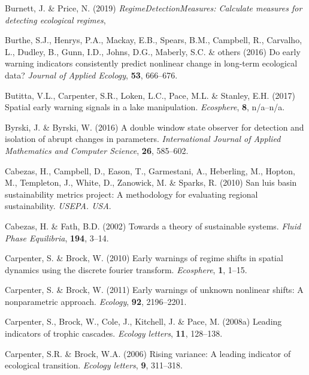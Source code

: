\documentclass[12pt,twoside,openany]{reedthesis}
\begin{document}
\leavevmode\hypertarget{ref-regimeDetectionMeasures}{}%
Burnett, J. \& Price, N. (2019) \emph{RegimeDetectionMeasures: Calculate measures for detecting ecological regimes},

\leavevmode\hypertarget{ref-burthe2016early}{}%
Burthe, S.J., Henrys, P.A., Mackay, E.B., Spears, B.M., Campbell, R., Carvalho, L., Dudley, B., Gunn, I.D., Johns, D.G., Maberly, S.C. \& others (2016) Do early warning indicators consistently predict nonlinear change in long-term ecological data? \emph{Journal of Applied Ecology}, \textbf{53}, 666--676.

\leavevmode\hypertarget{ref-butitta_spatial_2017}{}%
Butitta, V.L., Carpenter, S.R., Loken, L.C., Pace, M.L. \& Stanley, E.H. (2017) Spatial early warning signals in a lake manipulation. \emph{Ecosphere}, \textbf{8}, n/a--n/a.

\leavevmode\hypertarget{ref-byrski2016double}{}%
Byrski, J. \& Byrski, W. (2016) A double window state observer for detection and isolation of abrupt changes in parameters. \emph{International Journal of Applied Mathematics and Computer Science}, \textbf{26}, 585--602.

\leavevmode\hypertarget{ref-cabezas_san_2010}{}%
Cabezas, H., Campbell, D., Eason, T., Garmestani, A., Heberling, M., Hopton, M., Templeton, J., White, D., Zanowick, M. \& Sparks, R. (2010) San luis basin sustainability metrics project: A methodology for evaluating regional sustainability. \emph{USEPA. USA}.

\leavevmode\hypertarget{ref-cabezas_towards_2002}{}%
Cabezas, H. \& Fath, B.D. (2002) Towards a theory of sustainable systems. \emph{Fluid Phase Equilibria}, \textbf{194}, 3--14.

\leavevmode\hypertarget{ref-carpenter2010early}{}%
Carpenter, S. \& Brock, W. (2010) Early warnings of regime shifts in spatial dynamics using the discrete fourier transform. \emph{Ecosphere}, \textbf{1}, 1--15.

\leavevmode\hypertarget{ref-carpenterBrock2011early}{}%
Carpenter, S. \& Brock, W. (2011) Early warnings of unknown nonlinear shifts: A nonparametric approach. \emph{Ecology}, \textbf{92}, 2196--2201.

\leavevmode\hypertarget{ref-carpenter2008leading}{}%
Carpenter, S., Brock, W., Cole, J., Kitchell, J. \& Pace, M. (2008a) Leading indicators of trophic cascades. \emph{Ecology letters}, \textbf{11}, 128--138.

\leavevmode\hypertarget{ref-carpenter2006rising}{}%
Carpenter, S.R. \& Brock, W.A. (2006) Rising variance: A leading indicator of ecological transition. \emph{Ecology letters}, \textbf{9}, 311--318.
\end{document}
